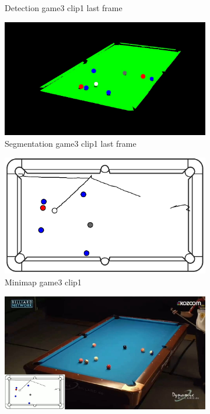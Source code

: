 \begin{figure}[H]
\begin{subfigure}[b]{0.48\textwidth}
        \caption{Detection game3 clip1 last frame}
        \label{fig: game3_clip1_last_frame_detected}
    \end{subfigure}
    \begin{subfigure}[b]{0.48\textwidth}
        \centering
        \includegraphics[width=\textwidth]{images/Segmentation/game3_clip1_segmented_balls_last_frame.jpg}
        \caption{Segmentation game3 clip1 last frame}
		\label{fig: game3_clip1_last_frame_segmented}
    \end{subfigure}
    \begin{subfigure}[b]{0.48\textwidth}
    	\centering
    	\includegraphics[width=\textwidth]{images/AllMinimap/game3_clip1_minimap.png}
    	\caption{Minimap game3 clip1}
    	\label{fig: game3_clip1_minimap}
    \end{subfigure}
    \begin{subfigure}[b]{0.48\textwidth}
    	\centering
    	\includegraphics[width=\textwidth]{images/Video/game3_clip1_video.jpg}

\end{subfigure}
\end{figure}
